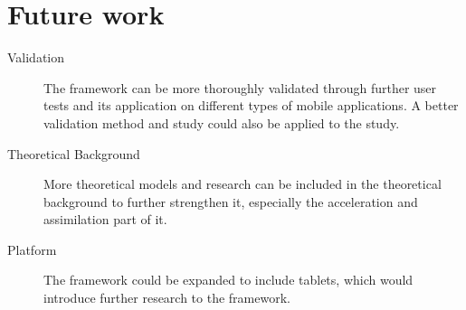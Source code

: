\section{Future work}

\begin{description}
  \item[Validation] The framework can be more thoroughly validated through further user tests and its application on different types of mobile applications. A better validation method and study could also be applied to the study.
  \item[Theoretical Background] More theoretical models and research can be included in the theoretical background to further strengthen it, especially the acceleration and assimilation part of it.
  \item[Platform] The framework could be expanded to include tablets, which would introduce further research to the framework.
\end{description}





